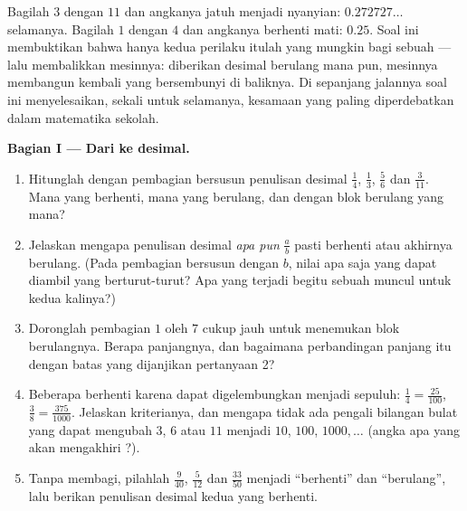 \begin{problem}
\label{pb:g9:fractions:1}
Bagilah $3$ dengan $11$ dan angkanya jatuh menjadi nyanyian:
$0.272727\ldots$ selamanya. Bagilah $1$ dengan $4$ dan angkanya
berhenti mati: $0.25$. Soal ini membuktikan bahwa hanya kedua
perilaku itulah yang mungkin bagi sebuah  --- lalu membalikkan
mesinnya: diberikan desimal berulang mana pun, mesinnya membangun
kembali  yang bersembunyi di baliknya. Di sepanjang jalannya
soal ini menyelesaikan, sekali untuk selamanya, kesamaan yang paling
diperdebatkan dalam matematika sekolah.

\medskip
\noindent\textbf{Bagian I --- Dari  ke desimal.}
\begin{enumerate}
  \item Hitunglah dengan pembagian bersusun penulisan desimal
        $\frac14$, $\frac13$, $\frac56$ dan $\frac{3}{11}$.
        Mana yang berhenti, mana yang berulang, dan dengan blok
        berulang yang mana?
  \item Jelaskan mengapa penulisan desimal  \emph{apa pun}
        $\frac ab$ pasti berhenti atau akhirnya berulang. (Pada
        pembagian bersusun dengan $b$, nilai apa saja yang dapat
        diambil  yang berturut-turut? Apa yang terjadi begitu
        sebuah  muncul untuk kedua kalinya?)
  \item Doronglah pembagian $1$ oleh $7$ cukup jauh untuk menemukan
        blok berulangnya. Berapa panjangnya, dan bagaimana
        perbandingan panjang itu dengan batas yang dijanjikan
        pertanyaan 2?
  \item Beberapa  berhenti karena  dapat
        digelembungkan menjadi  sepuluh: $\frac14 =
        \frac{25}{100}$, $\frac{3}{8} = \frac{375}{1000}$.
        Jelaskan kriterianya, dan mengapa tidak ada pengali
        bilangan bulat yang dapat mengubah $3$, $6$ atau $11$
        menjadi $10$, $100$,
        $1000, \dots$ (angka apa yang akan mengakhiri ?).
  \item Tanpa membagi, pilahlah $\frac{9}{40}$, $\frac{5}{12}$ dan
        $\frac{33}{50}$ menjadi ``berhenti'' dan ``berulang'', lalu
        berikan penulisan desimal kedua  yang berhenti.
\end{enumerate}


\end{problem}
